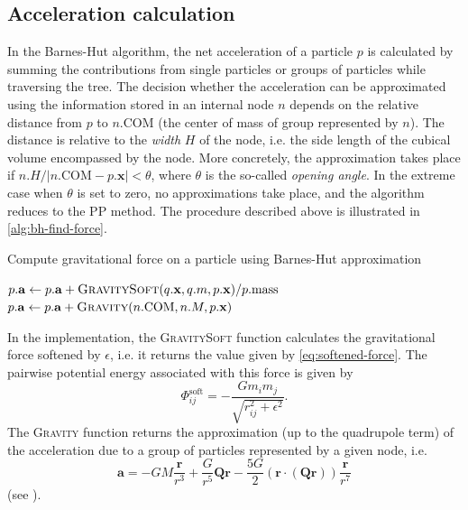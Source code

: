 \subsection{Acceleration calculation}
In the Barnes-Hut algorithm, the net acceleration of a particle $p$ is calculated by summing the contributions from single particles or groups of particles while traversing the tree.
The decision whether the acceleration can be approximated using the information stored in an internal node $n$ depends on the relative distance from $p$ to $n.\textrm{COM}$ (the center of mass of group represented by $n$).
The distance is relative to the \textit{width} $H$ of the node, i.e. the side length of the cubical volume encompassed by the node.
More concretely, the approximation takes place if $n.H / |n.\mathrm{COM} - p.\mathbf{x}| < \theta$, where $\theta$ is the so-called \textit{opening angle}.
In the extreme case when $\theta$ is set to zero, no approximations take place, and the algorithm reduces to the PP method.
The procedure described above is illustrated in \autoref{alg:bh-find-force}.
\begin{algorithm}
    \caption{Compute gravitational force on a particle using Barnes-Hut approximation}
    \label{alg:bh-find-force}
    \begin{algorithmic}[1]
        \State $p.\mathbf{a} \gets p.\mathbf{a} + \Call{GravitySoft}{q.\mathbf{x}, q.m, p.\mathbf{x}} / p.\text{mass}$
        \EndIf
        \State \Return
        \EndIf
        \State $p.\mathbf{a} \gets p.\mathbf{a} + \Call{Gravity}{n.\mathrm{COM}, n.M, p.\mathbf{x}}$
        \State \Return
        \EndIf
        \State {}
        \EndFor
        \EndFunction
    \end{algorithmic}
\end{algorithm}
In the implementation, the \textsc{GravitySoft} function calculates the gravitational force softened by $\epsilon$, i.e. it returns the value given by \autoref{eq:softened-force}.
The pairwise potential energy associated with this force is given by
\begin{equation}\label{eq:pe-soft}
    \Phi_{ij}^\textrm{soft} = - \frac{G m_i m_j}{\sqrt{r_{ij}^2 + \epsilon^2}}.
\end{equation}
The \textsc{Gravity} function returns the approximation (up to the quadrupole term) of the acceleration due to a group of particles represented by a given node, i.e.
\begin{equation*}
    \mathbf{a} = -GM \frac{\mathbf{r}}{r^3} + \frac{G}{r^5}\mathbf{Q}\mathbf{r} - \frac{5G}{2}(\mathbf{r} \cdot (\mathbf{Q} \mathbf{r})) \frac{\mathbf{r}}{r^7}
\end{equation*}
(see \cite{hernquist1987performance}).

